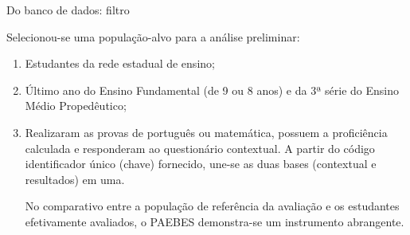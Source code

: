\documentclass[
  ignorenonframetext,
]{beamer}
\providecommand{\tightlist}{%
  \setlength{\itemsep}{0pt}\setlength{\parskip}{0pt}}
\begin{document}
\begin{frame}
Do banco de dados: filtro

Selecionou-se uma população-alvo para a análise preliminar:

\begin{enumerate}[<+->]
\tightlist
\item
  Estudantes da rede estadual de ensino;
\item
  Último ano do Ensino Fundamental (de 9 ou 8 anos) e da 3ª série do
  Ensino Médio Propedêutico;
\item
  Realizaram as provas de português ou matemática, possuem a
  proficiência calculada e responderam ao questionário contextual. A
  partir do código identificador único (chave) fornecido, une-se as duas
  bases (contextual e resultados) em uma.

  No comparativo entre a população de referência da avaliação e os
  estudantes efetivamente avaliados, o PAEBES demonstra-se um
  instrumento abrangente.
\end{enumerate}
\end{frame}
\end{document}
